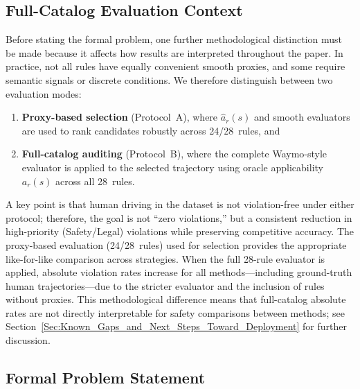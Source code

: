 \subsection{Full-Catalog Evaluation Context}
\label{subsec:fullcatalog_context}

Before stating the formal problem, one further methodological distinction must be made because it affects how results are interpreted throughout the paper.  In practice, not all rules have equally convenient smooth proxies, and some require semantic signals or discrete conditions.  We therefore distinguish between two evaluation modes:
\begin{enumerate}
\item \textbf{Proxy-based selection} (Protocol~A), where $\hat{a}_r(s)$ and smooth evaluators are used to rank candidates robustly across 24/28~rules, and \item \textbf{Full-catalog auditing} (Protocol~B), where the complete Waymo-style evaluator is applied to the selected trajectory using oracle applicability~$a_r(s)$ across all 28~rules.
\end{enumerate}

A key point is that human driving in the dataset is not violation-free under either protocol; therefore, the goal is not ``zero violations,'' but a consistent reduction in high-priority (Safety/Legal) violations while preserving competitive accuracy.  The proxy-based evaluation (24/28~rules) used for selection provides the appropriate like-for-like comparison across strategies.  When the full 28-rule evaluator is applied, absolute violation rates increase for all methods---including ground-truth human trajectories---due to the stricter evaluator and the inclusion of rules without proxies.  This methodological difference means that full-catalog absolute rates are not directly interpretable for safety comparisons between methods; see Section~\ref{Sec:Known_Gaps_and_Next_Steps_Toward_Deployment} for further discussion.

\subsection{Formal Problem Statement}
\label{subsec:problem_statement}


